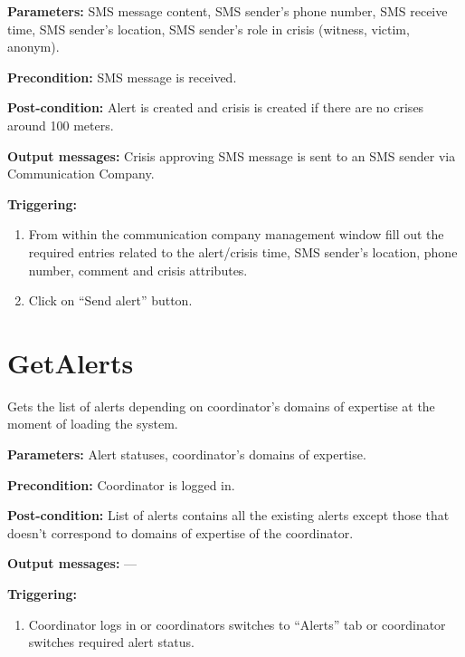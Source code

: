 \begin{description}

\item \textbf{Parameters:} SMS message content, SMS sender's phone number, SMS
receive time, SMS sender's location, SMS sender's role in crisis (witness,
victim, anonym).
\item \textbf{Precondition:} SMS message is received.
\item \textbf{Post-condition:} Alert is created and crisis is created if there
are no crises around 100 meters.
\item \textbf{Output messages:} Crisis approving SMS message is sent to an SMS
sender via Communication Company.

\item \textbf{Triggering:}
\begin{enumerate}
\item From within the communication company management window fill out the
required entries related to the alert/crisis time, SMS sender's location, phone
number, comment and crisis attributes.
\item Click on ``Send alert'' button.
\end{enumerate}
 
\end{description}

\section{GetAlerts}
\label{operation:GetAlerts}
 Gets the list of alerts depending on coordinator's domains of expertise at the
 moment of loading the system.

\begin{description}

\item \textbf{Parameters:} Alert statuses, coordinator's domains of expertise.
\item \textbf{Precondition:} Coordinator is logged in.
\item \textbf{Post-condition:} List of alerts contains all the existing alerts
except those that doesn't correspond to domains of expertise of the coordinator.
\item \textbf{Output messages:} ---

\item \textbf{Triggering:}
\begin{enumerate}
\item Coordinator logs in or coordinators switches to ``Alerts'' tab or
coordinator switches required alert status.
\end{enumerate}
 
\end{description}

